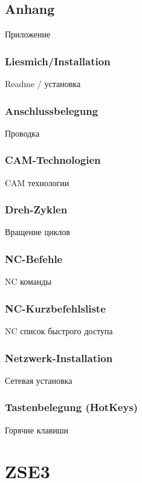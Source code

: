 \documentclass[14pt,a4paper]{book}
\begin{document}
\chapter{Anhang}{Приложение}
	\section{Liesmich/Installation}{Readme / установка}
	\section{Anschlussbelegung}{Проводка}
	\section{CAM-Technologien}{CAM технологии}
	\section{Dreh-Zyklen}{Вращение циклов}
	\section{NC-Befehle}{NC команды}
	\section{NC-Kurzbefehlsliste}{NC список быстрого доступа}
	\section{Netzwerk-Installation}{Сетевая установка}
	\section{Tastenbelegung (HotKeys)}{Горячие клавиши}


\part{ZSE3}
\end{document}
